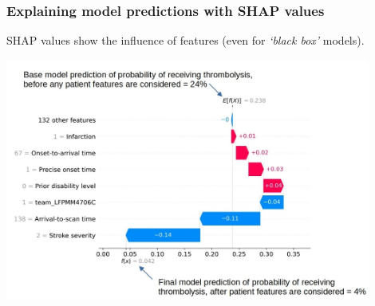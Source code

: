 \begin{frame}
\frametitle{Explaining model predictions with SHAP values}

SHAP values show the influence of features (even for \emph{`black box'} models).

\begin{center}
\includegraphics[width=0.90\textwidth]{./images/xgb_waterfall_low_probability_2.jpg}
\end{center}
\end{frame}